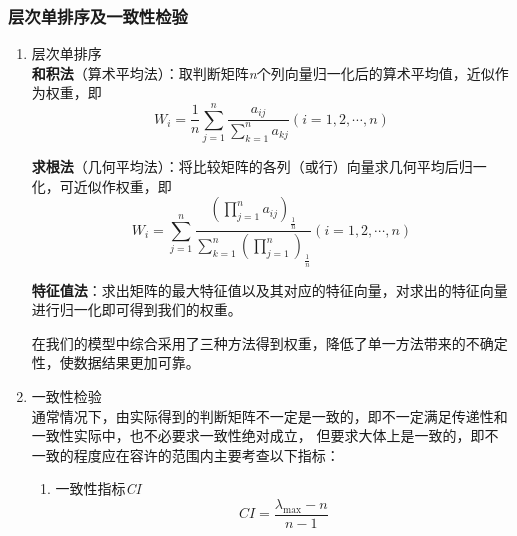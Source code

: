 \documentclass[a4paper, 12pt]{article}
\numberwithin{equation}{section}
\begin{document}
                \subsubsection{层次单排序及一致性检验}
                    \begin{enumerate}
                        \item 层次单排序 \\
                            \textbf{和积法}（算术平均法）：取判断矩阵\textit{n}个列向量归一化后的算术平均值，近似作为权重，即
                            \begin{equation}
                                W_{i} = \frac{1}{n} \sum_{j=1}^{n} \frac{a_{ij}}{\sum_{k=1}^{n} a_{kj}} (i = 1, 2, \cdots, n)
                            \end{equation}

                            \textbf{求根法}（几何平均法）：将比较矩阵的各列（或行）向量求几何平均后归一化，可近似作权重，即
                            \begin{equation}
                                W_{i} = \sum_{j=1}^{n} \frac{(\prod_{j=1}^{n} a_{ij})_{\frac{1}{n}}}{\sum_{k=1}^{n} (\prod_{j=1}^{n})_{\frac{1}{n}}} (i = 1, 2, \cdots, n)
                            \end{equation}

                            \textbf{特征值法}：求出矩阵的最大特征值以及其对应的特征向量，对求出的特征向量进行归一化即可得到我们的权重。

                            在我们的模型中综合采用了三种方法得到权重，降低了单一方法带来的不确定性，使数据结果更加可靠。


                        \item 一致性检验 \\
                        通常情况下，由实际得到的判断矩阵不一定是一致的，即不一定满足传递性和一致性实际中，也不必要求一致性绝对成立，
                        但要求大体上是一致的，即不一致的程度应在容许的范围内主要考查以下指标：
                            \begin{enumerate}
                                \item 一致性指标\textit{CI}
                                    \begin{equation}
                                        CI = \frac{\lambda _{\max} - n}{n - 1}
                                    \end{equation}


\end{enumerate}
\end{enumerate}
\end{document}
